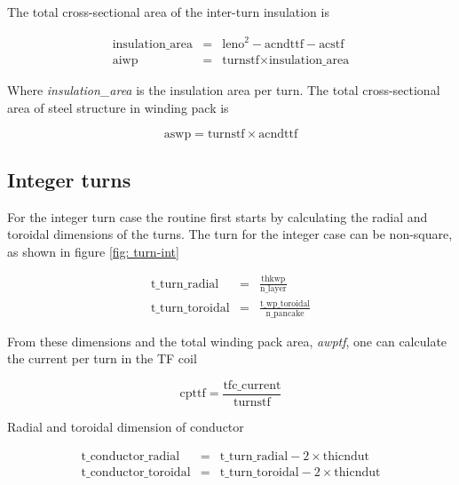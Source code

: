\documentclass[hidelinks]{article}
\numberwithin{equation}{section}
\begin{document}
       \noi The total cross-sectional area of the inter-turn insulation is 

       \begin{eqnarray}
           \text{insulation\_area} &=& \text{leno}^2 - \text{acndttf} - \text{acstf}\\
           \text{aiwp} &=& \text{turnstf} \times \text{insulation\_area}
       \end{eqnarray}
   
       \noi Where \emph{insulation\_area} is the insulation area per turn. The total cross-sectional 
       area of steel structure in winding pack is
   
       \begin{equation}
           \text{aswp} = \text{turnstf} \times \text{acndttf}
       \end{equation}

    \subsection{Integer turns}

    \noi For the integer turn case the routine first starts by calculating the radial and 
    toroidal dimensions of the turns. The turn for the integer case can be non-square, as 
    shown in figure \ref{fig: turn-int}

    \begin{eqnarray}
        \text{t\_turn\_radial} &=& \frac{\text{thkwp}}{\text{n\_layer}} \\
        \text{t\_turn\_toroidal} &=& \frac{\text{t\_wp\_toroidal}}{\text{n\_pancake}}
    \end{eqnarray}

    \noi From these dimensions and the total winding pack area, \emph{awptf}, one can calculate 
    the current per turn in the TF coil

    \begin{equation}
        \text{cpttf} = \frac{\text{tfc\_current}}{\text{turnstf}}
    \end{equation}

    \noi Radial and toroidal dimension of conductor
    
    \begin{eqnarray}
        \text{t\_conductor\_radial} &=& \text{t\_turn\_radial} - 2 \times \text{thicndut}\\
        \text{t\_conductor\_toroidal} &=& \text{t\_turn\_toroidal} - 2 \times \text{thicndut}
    \end{eqnarray}
\end{document}
